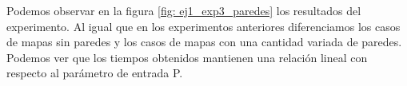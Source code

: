 \par Podemos observar en la figura \ref{fig: ej1_exp3_paredes} los resultados del experimento. Al igual que en los experimentos anteriores diferenciamos los casos de mapas sin paredes y los casos de mapas con una cantidad variada de paredes. Podemos ver que los tiempos obtenidos mantienen una relación lineal con respecto al parámetro de entrada P.



